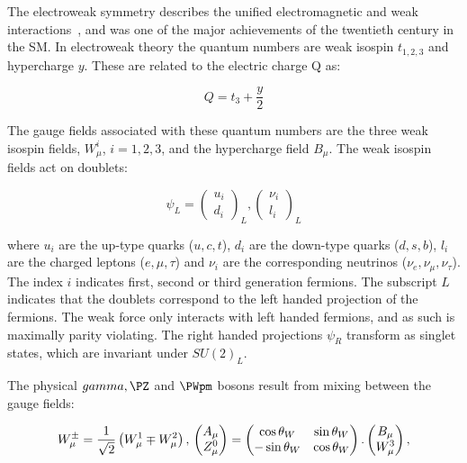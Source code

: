 The electroweak symmetry describes the unified electromagnetic and weak
interactions~\cite{GlashowPartialSymmetries,WeinbergModelOfLeptons,SalamNobelSymposium}, 
and was one of the major achievements of the twentieth
century in the \ac{SM}. In electroweak theory the quantum numbers are
weak isospin $t_{1,2,3}$ and hypercharge $y$. These are related to the
electric charge Q as: 

\begin{equation}
Q = t_{3} + \frac{y}{2}
\end{equation}

The gauge fields associated with these quantum numbers are the three weak isospin fields,
$W_{\mu}^{i}$, $i = 1,2,3$, and the hypercharge field $B_{\mu}$. The weak
isospin fields act on doublets: 

\begin{equation}
\psi_{L} =  \begin{pmatrix} u_{i} \\ d_{i} \end{pmatrix}_{L} ,   
\begin{pmatrix} \nu_{i} \\ {l_{i}} \end{pmatrix}_{L}
\end{equation}

where $u_{i}$ are the up-type quarks ($u,c,t$), $d_{i}$ are the down-type quarks
($d,s,b$), $l_{i}$ are the charged leptons ($e,\mu,\tau$) and $\nu_{i}$ are the
corresponding neutrinos ($\nu_{e},\nu_{\mu},\nu_{\tau}$). The index $i$ indicates first, second or third
generation fermions. The subscript $L$ indicates that the doublets correspond to
the left handed projection of the fermions. The weak force only interacts with
left handed fermions, and as such is maximally parity violating. The right
handed projections $\psi_{R}$
transform as singlet states, which are invariant under $SU(2)_{L}$.

The physical $\gamma, \PZ$ and $\PWpm$ bosons result from mixing between the gauge
fields:

\begin{equation}
W_{\mu}^{\pm} = \frac{1}{\sqrt{2}}\left(W_{\mu}^{1} \mp W_{\mu}^{2}\right) ,\\
\begin{pmatrix} A_{\mu} \\ Z_{\mu}^{0} \end{pmatrix} = 
\begin{pmatrix} \cos{\theta_{W}} & \sin{\theta_{W}} \\ -\sin{\theta_{W}} &
\cos{\theta_{W}} \end{pmatrix} . 
\begin{pmatrix} B_{\mu} \\ W_{\mu}^{3} \end{pmatrix} ,
\end{equation}

